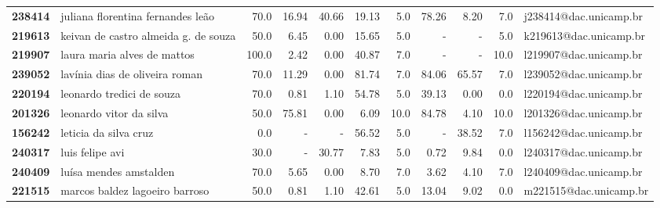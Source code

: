 \documentclass[11pt]{article}
\begin{document}
\begin{center}
\begin{landscape}
\begin{longtable}{llrrrrrrrrl}
\textbf{238414} &     juliana florentina fernandes leão &                  70.0 &       16.94 &       40.66 &       19.13 &                      5.0 &       78.26 &        8.20 &                        7.0 &  j238414@dac.unicamp.br \\
\textbf{219613} &  keivan de castro almeida g. de souza &                  50.0 &        6.45 &        0.00 &       15.65 &                      5.0 &           - &           - &                        5.0 &  k219613@dac.unicamp.br \\
\textbf{219907} &           laura maria alves de mattos &                 100.0 &        2.42 &        0.00 &       40.87 &                      7.0 &           - &           - &                       10.0 &  l219907@dac.unicamp.br \\
\textbf{239052} &        lavínia dias de oliveira roman &                  70.0 &       11.29 &        0.00 &       81.74 &                      7.0 &       84.06 &       65.57 &                        7.0 &  l239052@dac.unicamp.br \\
\textbf{220194} &             leonardo tredici de souza &                  70.0 &        0.81 &        1.10 &       54.78 &                      5.0 &       39.13 &        0.00 &                        0.0 &  l220194@dac.unicamp.br \\
\textbf{201326} &               leonardo vitor da silva &                  50.0 &       75.81 &        0.00 &        6.09 &                     10.0 &       84.78 &        4.10 &                       10.0 &  l201326@dac.unicamp.br \\
\textbf{156242} &                 leticia da silva cruz &                   0.0 &           - &           - &       56.52 &                      5.0 &           - &       38.52 &                        7.0 &  l156242@dac.unicamp.br \\
\textbf{240317} &                       luis felipe avi &                  30.0 &           - &       30.77 &        7.83 &                      5.0 &        0.72 &        9.84 &                        0.0 &  l240317@dac.unicamp.br \\
\textbf{240409} &                luísa mendes amstalden &                  70.0 &        5.65 &        0.00 &        8.70 &                      7.0 &        3.62 &        4.10 &                        7.0 &  l240409@dac.unicamp.br \\
\textbf{221515} &        marcos baldez lagoeiro barroso &                  50.0 &        0.81 &        1.10 &       42.61 &                      5.0 &       13.04 &        9.02 &                        0.0 &  m221515@dac.unicamp.br \\

\end{longtable}
\end{landscape}
\end{center}
\end{document}
